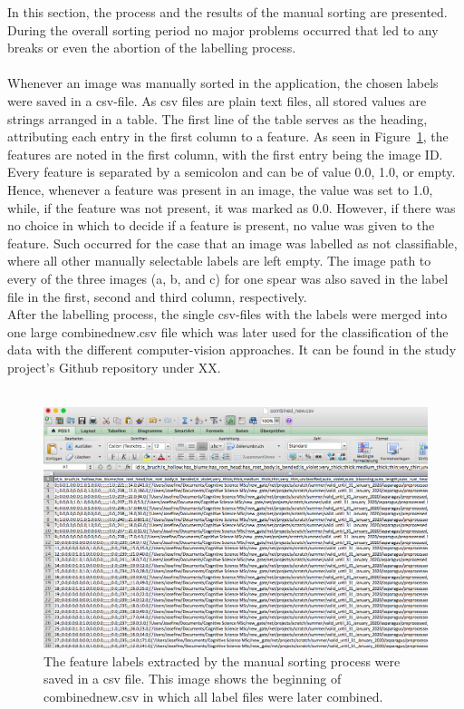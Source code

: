 In this section, the process and the results of the manual sorting are presented.
During the overall sorting period no major problems occurred that led to any breaks or even the abortion of the labelling process. \\
\\
Whenever an image was manually sorted in the application, the chosen labels were saved in a csv-file. As csv files are plain text files, all stored values are strings arranged in a table. The first line of the table serves as the heading, attributing each entry in the first column to a feature. As seen in Figure~\ref{fig:CSVfileOverview}, the features are noted in the first column, with the first entry being the image ID. Every feature is separated by a semicolon and can be of value 0.0, 1.0, or empty. Hence, whenever a feature was present in an image, the value was set to 1.0, while, if the feature was not present, it was marked as 0.0. However, if there was no choice in which to decide if a feature is present, no value was given to the feature. Such occurred for the case that an image was labelled as not classifiable, where all other manually selectable labels are left empty. The image path to every of the three images (a, b, and c) for one spear was also saved in the label file in the first, second and third column, respectively. \\
After the labelling process, the single csv-files with the labels were merged into one large combined\textunderscore new.csv file which was later used for the classification of the data with the different computer-vision approaches. It can be found in the study project’s Github repository under XX. \\
\\
\begin{figure}[h]
	\centering
	\includegraphics[scale=0.4]{Figures/chapter03/csv_overview}
	\decoRule
	\caption[CSV-File Output]{The feature labels extracted by the manual sorting process were saved in a csv file. This image shows the beginning of combined\textunderscore new.csv in which all label files were later combined.}
	\label{fig:CSVfileOverview}
\end{figure}
